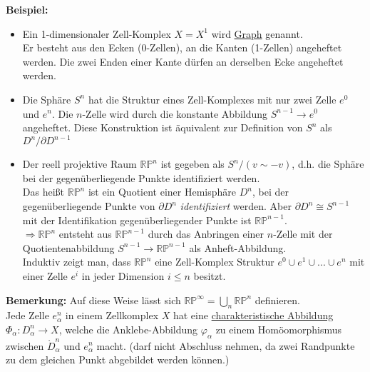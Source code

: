 \documentclass[fleqn, 12pt, letterpaper]{article}
\begin{document}
\textbf{Beispiel:}
\begin{itemize}
\item Ein 1-dimensionaler Zell-Komplex \( X = X^1 \) wird \underline{Graph} genannt. \\
Er besteht aus den Ecken (0-Zellen), an die Kanten (1-Zellen) angeheftet werden. 
Die zwei Enden einer Kante dürfen an derselben Ecke angeheftet werden.


\item Die Sphäre \( S^n \) hat die Struktur eines Zell-Komplexes mit nur zwei Zelle $e^0$ und $e^n$. Die \( n \)-Zelle wird durch die konstante Abbildung \( S^{n-1} \rightarrow e^0\) angeheftet. 
Diese Konstruktion ist äquivalent zur Definition von \( S^n \) als $D^n/\partial D^{n-1}$
\item Der reell projektive Raum \( \mathbb{RP}^n \) ist gegeben als \( S^n / (v\sim -v) \), 
d.h. die Sphäre bei der gegenüberliegende Punkte identifiziert werden. \\

Das heißt \( \mathbb{RP}^n \) ist ein Quotient einer Hemisphäre $D^n$, bei der gegenüberliegende Punkte von $\partial D^n$ \emph{identifiziert} werden. Aber $\partial D^n \cong S^{n-1}$ mit der Identifikation gegenüberliegender Punkte ist \( \mathbb{RP}^{n-1} \). \\
\(\Rightarrow \mathbb{RP}^n \) entsteht aus \( \mathbb{RP}^{n-1} \) durch das Anbringen einer \( n \)-Zelle 
mit der Quotientenabbildung \( S^{n-1} \rightarrow \mathbb{RP}^{n-1} \) als Anheft-Abbildung.\\

Induktiv zeigt man, dass \( \mathbb{RP}^n \) eine Zell-Komplex Struktur $e^0\cup e^1 \cup...\cup e^n$ mit einer Zelle \( e^i \) in jeder Dimension \( i \leq n \) besitzt.
\end{itemize}



\textbf{Bemerkung:} Auf diese Weise lässt sich \( \mathbb{RP}^\infty = \bigcup_n \mathbb{RP}^n \) definieren.\\

Jede Zelle \( e^n_\alpha \) in einem Zellkomplex \( X \) hat eine \underline{charakteristische Abbildung} $\Phi_\alpha:D_\alpha^n\to X$, 
welche die Anklebe-Abbildung \( \varphi_\alpha \) zu einem Homöomorphismus zwischen \( \mathring{D}_\alpha^n \) und \( e^n_\alpha \) macht. (darf nicht Abschluss nehmen, da zwei Randpunkte zu dem gleichen Punkt abgebildet werden können.)\\
\end{document}
